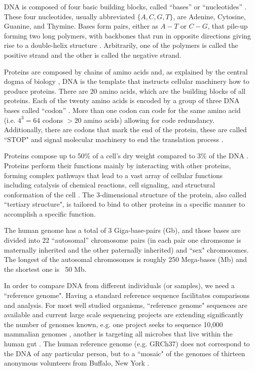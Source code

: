 DNA is composed of four basic building blocks, called ``bases'' or ``nucleotides'' \cite{alberts1995molecular}. These four nucleotides, usually abbreviated $\{A, C, G, T\}$, are Adenine, Cytosine, Guanine, and Thymine. Bases form pairs, either as $A-T$ or $C-G$, that pile-up forming two long polymers, with backbones that run in opposite directions giving rise to a double-helix structure \cite{watson1953molecular}. Arbitrarily, one of the polymers is called the positive strand and the other is called the negative strand. 

Proteins are composed by chains of amino acids and, as explained by the central dogma of biology \cite{alberts1995molecular},  DNA is the template that instructs cellular machinery how to produce proteins. There are 20 amino acids, which are the building blocks of all proteins. Each of the twenty amino acids is encoded by a group of three DNA bases called ``codon'' \cite{crick1961general}. More than one codon can code for the same amino acid (i.e. $4^3=64$ codons $ > 20 $ amino acids) allowing for code redundancy. Additionally, there are codons that mark the end of the protein, these are called ``STOP" and signal molecular machinery to end the translation process \cite{brenner1965genetic}.

Proteins compose up to 50\% of a cell's dry weight compared to 3\% of the DNA \cite{alberts1995molecular}. Proteins perform their functions mainly by interacting with other proteins, forming complex pathways that lead to a vast array of cellular functions including catalysis of chemical reactions, cell signaling, and structural conformation of the cell \cite{alberts1995molecular}. The 3-dimensional structure of the protein, also called ``tertiary structure", is tailored to bind to other proteins in a specific manner to accomplish a specific function. 

The human genome has a total of 3 Giga-base-pairs (Gb), and those bases are divided into 22 ``autosomal'' chromosome pairs (in each pair one chromsome is maternally inherited and the other paternally inherited) and ``sex" chromosomes. The longest of the autosomal chromosomes is roughly 250 Mega-bases (Mb) and the shortest one is ~50 Mb.

In order to compare DNA from different individuals (or samples), we need a ``reference genome". Having a standard reference sequence facilitates comparisons and analysis. For most well studied organisms, ``reference genome" sequences are available and current large scale sequencing projects are extending significantly the number of genomes known, e.g. one project seeks to sequence 10,000 mammalian genomes \cite{haussler2009genome}, another is targeting all microbes that live within the human gut \cite{turnbaugh2007human}. The human reference genome (e.g. GRCh37) does not correspond to the DNA of any particular person, but to a ``mosaic" of the genomes of thirteen anonymous volunteers from Buffalo, New York \cite{schneider2013genome}.

